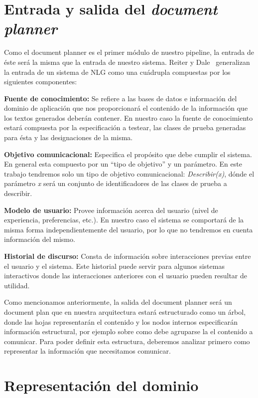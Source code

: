 \section{Entrada y salida del \textit{document planner}}
Como el document planner es el primer módulo de nuestro pipeline, la entrada de éste será la misma que la entrada de nuestro sistema. Reiter y Dale~\cite{reiter_dale} generalizan la entrada de un sistema de NLG  como una cuádrupla compuestas por los siguientes componentes:

\bigskip
\noindent
\textbf{Fuente de conocimiento:} Se refiere a las bases de datos e información del dominio de aplicación que nos proporcionará el contenido de la información que los textos generados deberán contener.
En nuestro caso la fuente de conocimiento estará compuesta por la especificación a testear, las clases de prueba generadas para ésta y las designaciones de la misma. 

\bigskip
\noindent
\textbf{Objetivo comunicacional:} Especifica el propósito que debe cumplir el sistema. En general esta compuesto por un ``tipo de objetivo'' y un parámetro.
En este trabajo tendremos solo un tipo de objetivo comunicacional: \emph{Describir(x)}, dónde el parámetro \emph{x} será un conjunto de identificadores de las clases de prueba a describir.

\bigskip
\noindent
\textbf{Modelo de usuario:} Provee información acerca del usuario (nivel de experiencia, preferencias, etc.). En nuestro caso el sistema se comportará de la misma forma independientemente del usuario, por lo que no tendremos en cuenta información del mismo.

\bigskip
\noindent
\textbf{Historial de discurso:} Consta de información sobre interacciones previas entre el usuario y el sistema. Este historial puede servir para algunos sistemas interactivos donde las interacciones anteriores con el usuario pueden resultar de utilidad. 

\bigskip
Como mencionamos anteriormente, la salida del document planner será un document plan que en nuestra arquitectura estará estructurado como un árbol, donde las hojas representarán el contenido y los nodos internos especificarán información estructural, por ejemplo sobre como debe agruparse la el contenido a comunicar. Para poder definir esta estructura, deberemos analizar primero como representar la información que necesitamos comunicar.

\section{Representación del dominio}


